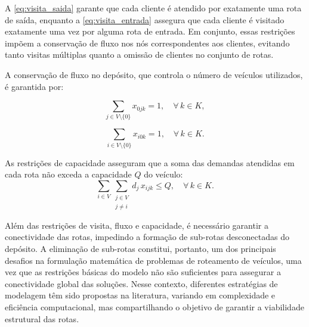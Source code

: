 A \autoref{eq:visita_saida} garante que cada cliente é atendido por exatamente uma rota de saída, enquanto a \autoref{eq:visita_entrada} assegura que cada cliente é visitado exatamente uma vez por alguma rota de entrada. Em conjunto, essas restrições impõem a conservação de fluxo nos nós correspondentes aos clientes, evitando tanto visitas múltiplas quanto a omissão de clientes no conjunto de rotas.

A conservação de fluxo no depósito, que controla o número de veículos utilizados, é garantida por:

\begin{equation}
    \sum_{j \in V \setminus \{0\}} x_{0jk} = 1, \quad \forall\, k \in K,
    \label{eq:fluxo_saida}
\end{equation}

\begin{equation}
    \sum_{i \in V \setminus \{0\}} x_{i0k} = 1, \quad \forall\, k \in K.
    \label{eq:fluxo_entrada}
\end{equation}

As restrições de capacidade asseguram que a soma das demandas atendidas em cada rota não exceda a capacidade $Q$ do veículo:
\begin{equation}
    \sum_{i \in V} \sum_{\substack{j \in V \\ j \neq i}} d_j\, x_{ijk} \leq Q, 
    \quad \forall\, k \in K.
    \label{eq:capacidade}
\end{equation}

Além das restrições de visita, fluxo e capacidade, é necessário garantir a conectividade das rotas, impedindo a formação de sub-rotas desconectadas do depósito. A eliminação de sub-rotas constitui, portanto, um dos principais desafios na formulação matemática de problemas de roteamento de veículos, uma vez que as restrições básicas do modelo não são suficientes para assegurar a conectividade global das soluções. Nesse contexto, diferentes estratégias de modelagem têm sido propostas na literatura, variando em complexidade e eficiência computacional, mas compartilhando o objetivo de garantir a viabilidade estrutural das rotas.

